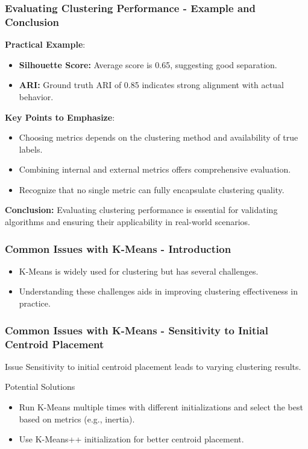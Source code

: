 \documentclass[aspectratio=169]{beamer}
\begin{document}
\begin{frame}[fragile]
    \frametitle{Evaluating Clustering Performance - Example and Conclusion}
    \textbf{Practical Example}:
    \begin{itemize}
        \item \textbf{Silhouette Score:} Average score is 0.65, suggesting good separation.
        \item \textbf{ARI:} Ground truth ARI of 0.85 indicates strong alignment with actual behavior.
    \end{itemize}

    \textbf{Key Points to Emphasize}:
    \begin{itemize}
        \item Choosing metrics depends on the clustering method and availability of true labels.
        \item Combining internal and external metrics offers comprehensive evaluation.
        \item Recognize that no single metric can fully encapsulate clustering quality.
    \end{itemize}

    \textbf{Conclusion:} Evaluating clustering performance is essential for validating algorithms and ensuring their applicability in real-world scenarios.
\end{frame}

\begin{frame}[fragile]
    \frametitle{Common Issues with K-Means - Introduction}
    \begin{itemize}
        \item K-Means is widely used for clustering but has several challenges.
        \item Understanding these challenges aids in improving clustering effectiveness in practice.
    \end{itemize}
\end{frame}

\begin{frame}[fragile]
    \frametitle{Common Issues with K-Means - Sensitivity to Initial Centroid Placement}
    \begin{block}{Issue}
        Sensitivity to initial centroid placement leads to varying clustering results.
    \end{block}
    \begin{block}{Potential Solutions}
        \begin{itemize}
            \item Run K-Means multiple times with different initializations and select the best based on metrics (e.g., inertia).
            \item Use K-Means++ initialization for better centroid placement.
        \end{itemize}
    \end{block}
\end{frame}
\end{document}
